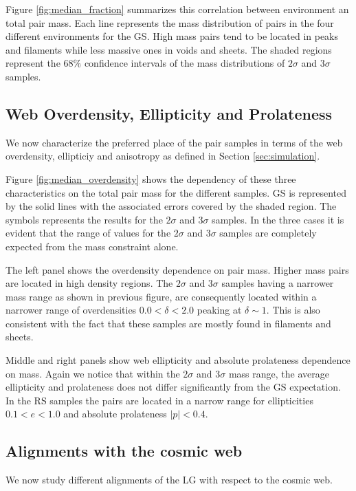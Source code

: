 \documentclass{emulateapj}
\begin{document}
Figure \ref{fig:median_fraction} summarizes this correlation between
environment an total pair mass.
Each line represents the mass distribution of pairs in the four
different environments for the GS.
High mass pairs tend to be located in  peaks and filaments while less
massive ones in voids and sheets. 
The shaded regions represent the $68\%$ confidence intervals of the mass 
distributions of $2\sigma$ and $3\sigma$ samples.


\subsection{Web Overdensity, Ellipticity and Prolateness}

We now characterize the preferred place of the pair samples in terms of the
web overdensity, ellipticiy and anisotropy as defined in Section
\ref{sec:simulation}. 

Figure \ref{fig:median_overdensity} shows the dependency of these three
characteristics  on the total pair mass for the different samples.
GS is represented by the solid lines with the associated 
errors covered by the shaded region. 
The symbols represents the results for the $2\sigma$ and $3\sigma$
samples.   
In the three cases it is evident that the range of values for the
$2\sigma$ and $3\sigma$ samples are completely expected from the mass
constraint alone.

The left panel shows the overdensity dependence on pair mass. 
Higher mass pairs are located in high density regions.
The $2\sigma$ and $3\sigma$ samples having a narrower mass range as 
shown in previous figure, are consequently located within a narrower 
range of overdensities $0.0<\delta<2.0$ peaking at $\delta \sim 1$. 
This is also consistent with the fact that these samples are mostly 
found in filaments and sheets. 

Middle and right panels show web ellipticity and absolute prolateness
dependence on mass. 
Again we notice that within the $2\sigma$ and $3\sigma$ mass range,
the average ellipticity and prolateness does not differ significantly
from the GS expectation.
In the RS samples the pairs are located in a narrow range for
ellipticities $0.1<e<1.0$ and absolute prolateness $|p|<0.4$. 


\subsection{Alignments with the cosmic web}

We now study different alignments of the LG with respect to the cosmic web. 
\end{document}
